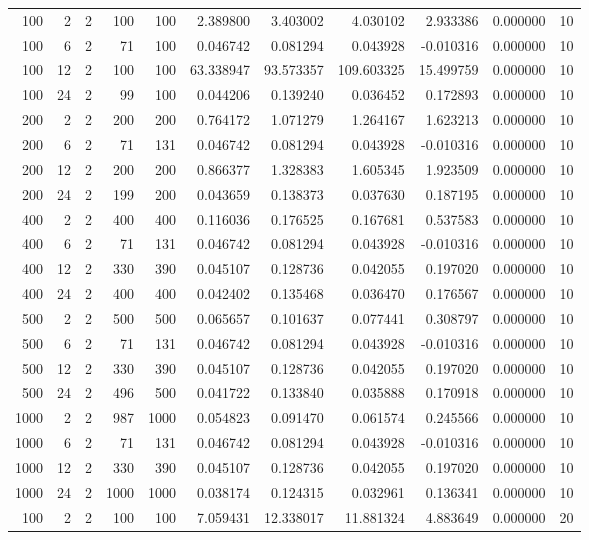 \begin{table}
\begin{tabular}{rrrrrrrrrrr}
100 & 2 & 2 & 100 & 100 & 2.389800 & 3.403002 & 4.030102 & 2.933386 & 0.000000 & 10 \\
100 & 6 & 2 & 71 & 100 & 0.046742 & 0.081294 & 0.043928 & -0.010316 & 0.000000 & 10 \\
100 & 12 & 2 & 100 & 100 & 63.338947 & 93.573357 & 109.603325 & 15.499759 & 0.000000 & 10 \\
100 & 24 & 2 & 99 & 100 & 0.044206 & 0.139240 & 0.036452 & 0.172893 & 0.000000 & 10 \\
200 & 2 & 2 & 200 & 200 & 0.764172 & 1.071279 & 1.264167 & 1.623213 & 0.000000 & 10 \\
200 & 6 & 2 & 71 & 131 & 0.046742 & 0.081294 & 0.043928 & -0.010316 & 0.000000 & 10 \\
200 & 12 & 2 & 200 & 200 & 0.866377 & 1.328383 & 1.605345 & 1.923509 & 0.000000 & 10 \\
200 & 24 & 2 & 199 & 200 & 0.043659 & 0.138373 & 0.037630 & 0.187195 & 0.000000 & 10 \\
400 & 2 & 2 & 400 & 400 & 0.116036 & 0.176525 & 0.167681 & 0.537583 & 0.000000 & 10 \\
400 & 6 & 2 & 71 & 131 & 0.046742 & 0.081294 & 0.043928 & -0.010316 & 0.000000 & 10 \\
400 & 12 & 2 & 330 & 390 & 0.045107 & 0.128736 & 0.042055 & 0.197020 & 0.000000 & 10 \\
400 & 24 & 2 & 400 & 400 & 0.042402 & 0.135468 & 0.036470 & 0.176567 & 0.000000 & 10 \\
500 & 2 & 2 & 500 & 500 & 0.065657 & 0.101637 & 0.077441 & 0.308797 & 0.000000 & 10 \\
500 & 6 & 2 & 71 & 131 & 0.046742 & 0.081294 & 0.043928 & -0.010316 & 0.000000 & 10 \\
500 & 12 & 2 & 330 & 390 & 0.045107 & 0.128736 & 0.042055 & 0.197020 & 0.000000 & 10 \\
500 & 24 & 2 & 496 & 500 & 0.041722 & 0.133840 & 0.035888 & 0.170918 & 0.000000 & 10 \\
1000 & 2 & 2 & 987 & 1000 & 0.054823 & 0.091470 & 0.061574 & 0.245566 & 0.000000 & 10 \\
1000 & 6 & 2 & 71 & 131 & 0.046742 & 0.081294 & 0.043928 & -0.010316 & 0.000000 & 10 \\
1000 & 12 & 2 & 330 & 390 & 0.045107 & 0.128736 & 0.042055 & 0.197020 & 0.000000 & 10 \\
1000 & 24 & 2 & 1000 & 1000 & 0.038174 & 0.124315 & 0.032961 & 0.136341 & 0.000000 & 10 \\
100 & 2 & 2 & 100 & 100 & 7.059431 & 12.338017 & 11.881324 & 4.883649 & 0.000000 & 20 \\

\end{tabular}
\end{table}
